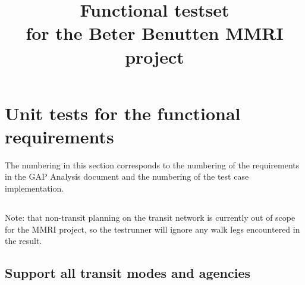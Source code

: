 \documentclass[a4paper,11pt]{article}
\begin{document}
\title{Functional testset \\ \large for the Beter Benutten MMRI project}
\author{}
\date{}
\maketitle



\section{Unit tests for the functional requirements}

The numbering in this section corresponds to the numbering of the requirements in the GAP Analysis document and the numbering of the test case implementation.

\subsection*{}
Note: that non-transit planning on the transit network is currently out of scope for the MMRI project, so the testrunner will ignore any walk legs encountered in the result.

\newpage
\subsection{Support all transit modes and agencies}
\end{document}
